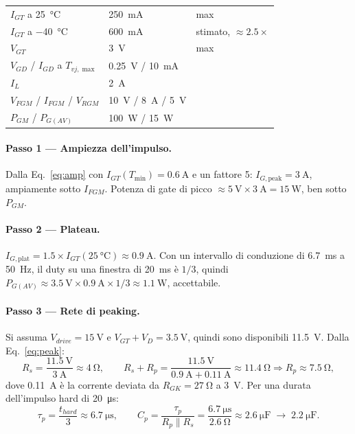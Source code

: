 \documentclass[11pt,a4paper]{article}
\begin{document}
\begin{center}
\begin{tabular}{@{}lll@{}}
\toprule
$I_{GT}$ a \SI{25}{\celsius} & \SI{250}{\milli\ampere} & max \\
$I_{GT}$ a \SI{-40}{\celsius} & \SI{600}{\milli\ampere} & stimato, $\approx 2.5\times$ \\
$V_{GT}$ & \SI{3}{\volt} & max \\
$V_{GD}$ / $I_{GD}$ a $T_{vj,\max}$ & \SI{0.25}{\volt} / \SI{10}{\milli\ampere} & \\
$I_L$ & \SI{2}{\ampere} & \\
$V_{FGM}$ / $I_{FGM}$ / $V_{RGM}$ & \SI{10}{\volt} / \SI{8}{\ampere} / \SI{5}{\volt} & \\
$P_{GM}$ / $P_{G(AV)}$ & \SI{100}{\watt} / \SI{15}{\watt} & \\
\bottomrule
\end{tabular}
\end{center}

\paragraph{Passo 1 --- Ampiezza dell'impulso.}
Dalla Eq.~\eqref{eq:amp} con $I_{GT}(T_{\min}) = \SI{0.6}{\ampere}$ e un fattore 5:
$I_{G,\text{peak}} = \SI{3}{\ampere}$, ampiamente sotto $I_{FGM}$. Potenza di gate di
picco $\approx \SI{5}{\volt}\times\SI{3}{\ampere} = \SI{15}{\watt}$, ben sotto
$P_{GM}$.

\paragraph{Passo 2 --- Plateau.}
$I_{G,\text{plat}} = 1.5\times I_{GT}(\SI{25}{\celsius}) \approx
\SI{0.9}{\ampere}$. Con un intervallo di conduzione di \SI{6.7}{\milli\second} a
\SI{50}{\hertz}, il duty su una finestra di \SI{20}{\milli\second} è $1/3$, quindi
$P_{G(AV)} \approx \SI{3.5}{\volt}\times\SI{0.9}{\ampere}\times 1/3 \approx
\SI{1.1}{\watt}$, accettabile.

\paragraph{Passo 3 --- Rete di peaking.}
Si assuma $V_{drive} = \SI{15}{\volt}$ e $V_{GT}+V_{D} = \SI{3.5}{\volt}$, quindi
sono disponibili \SI{11.5}{\volt}. Dalla Eq.~\eqref{eq:peak}:
\[
  R_s = \frac{\SI{11.5}{\volt}}{\SI{3}{\ampere}} \approx \SI{4}{\ohm},
  \qquad
  R_s + R_p = \frac{\SI{11.5}{\volt}}{\SI{0.9}{\ampere} + \SI{0.11}{\ampere}}
  \approx \SI{11.4}{\ohm} \Rightarrow R_p \approx \SI{7.5}{\ohm},
\]
dove \SI{0.11}{\ampere} è la corrente deviata da $R_{GK} = \SI{27}{\ohm}$ a
\SI{3}{\volt}. Per una durata dell'impulso hard di \SI{20}{\micro\second}:
\[
  \tau_p = \frac{t_{hard}}{3} \approx \SI{6.7}{\micro\second},
  \qquad
  C_p = \frac{\tau_p}{R_p \parallel R_s}
      = \frac{\SI{6.7}{\micro\second}}{\SI{2.6}{\ohm}} \approx \SI{2.6}{\micro\farad}
      \;\rightarrow\; \SI{2.2}{\micro\farad}.
\]
\end{document}
